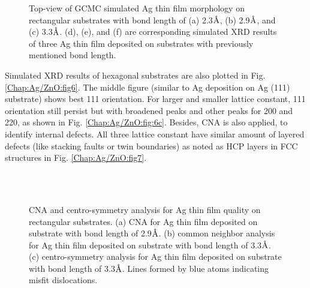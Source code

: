 \begin{figure}[!ht]
\caption[GCMC simulation and simulated XRD results of Ag thin film morphology on rectangular substrates.]{Top-view of \ac{GCMC} simulated Ag thin film morphology on rectangular substrates with bond length of (a) 2.3$\mbox{\normalfont\AA}$, (b) 2.9$\mbox{\normalfont\AA}$, and (c) 3.3$\mbox{\normalfont\AA}$. (d), (e), and (f) are corresponding simulated \ac{XRD} results of three Ag thin film  deposited on substrates with previously mentioned bond length.}
  \label{Chap:Ag/ZnO:fig8}
\end{figure}
\endgroup

Simulated \ac{XRD} results of hexagonal substrates are also plotted in Fig. \ref{Chap:Ag/ZnO:fig6}. The middle figure (similar to Ag deposition on Ag (111) substrate) shows best {111} orientation. For larger and smaller lattice constant, {111} orientation still persist but with broadened peaks and other peaks for {200} and {220}, as shown in Fig. \ref{Chap:Ag/ZnO:fig:6c}. Besides, \acf{CNA} \cite{kelton1991crystal} is also applied, to identify internal defects. All three lattice constant have similar amount of layered defects (like stacking faults or twin boundaries) as noted as \ac{HCP} layers in \ac{FCC} structures in Fig. \ref{Chap:Ag/ZnO:fig7}.

\begingroup
\begin{figure}[!ht]
  \centering
  \label{Chap:Ag/ZnO:fig:9a}
  \\
  \label{Chap:Ag/ZnO:fig:9b}
  \\
  \label{Chap:Ag/ZnO:fig:9c}
\caption[Common neighbor analysis and centro-symmetry analysis for Ag thin film quality on rectangular substrates.]{\ac{CNA} and centro-symmetry analysis for Ag thin film quality on rectangular substrates. (a) \ac{CNA} for Ag thin film deposited on substrate with bond length of 2.9$\mbox{\normalfont\AA}$. (b) common neighbor analysis for Ag thin film deposited on substrate with bond length of 3.3$\mbox{\normalfont\AA}$. (c) centro-symmetry analysis for Ag thin film deposited on substrate with bond length of 3.3$\mbox{\normalfont\AA}$. Lines formed by blue atoms indicating misfit dislocations.}
  \label{Chap:Ag/ZnO:fig9}
\end{figure}
\endgroup

